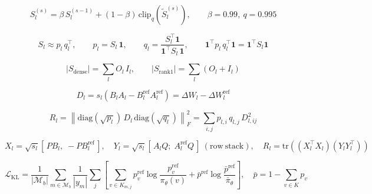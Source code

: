 \begin{equation}
  S_l^{(s)} = \beta\,S_l^{(s-1)} + (1-\beta)\,\mathrm{clip}_{q}\left(\tilde{S}_l^{(s)}\right),\qquad \beta = 0.99,\ q = 0.995
  \label{eq:eq_ema}
\end{equation}

\begin{equation}
  S_l \approx p_l\,q_l^{\top},\qquad p_l = S_l\,\mathbf{1},\qquad q_l = \frac{S_l^{\top}\mathbf{1}}{\mathbf{1}^{\top} S_l\,\mathbf{1}},\qquad \mathbf{1}^{\top}p_l\,q_l^{\top}\mathbf{1} = \mathbf{1}^{\top}S_l\mathbf{1}
  \label{eq:eq_rank1}
\end{equation}

\begin{equation}
  |S_{\mathrm{dense}}| = \sum_{l} O_l\,I_l,\qquad |S_{\mathrm{rank1}}| = \sum_{l}\left(O_l + I_l\right)
  \label{eq:eq_storage}
\end{equation}

\begin{equation}
  D_l = s_l\left(B_l A_l - B_l^{\mathrm{ref}} A_l^{\mathrm{ref}}\right) = \Delta W_l - \Delta W_l^{\mathrm{ref}}
  \label{eq:eq_D}
\end{equation}

\begin{equation}
  R_l = \left\| \mathrm{diag}\left(\sqrt{p_l}\right)\,D_l\,\mathrm{diag}\left(\sqrt{q_l}\right) \right\|_F^2 = \sum_{i,j} p_{l,i}\,q_{l,j}\,D_{l,ij}^2
  \label{eq:eq_R}
\end{equation}

\begin{equation}
  X_l = \sqrt{s_l}\left[\,P B_l,\; -P B_l^{\mathrm{ref}}\,\right],\quad Y_l = \sqrt{s_l}\left[\,A_l Q;\; A_l^{\mathrm{ref}} Q\,\right]\ (\mathrm{row\ stack}),\quad R_l = \mathrm{tr}\left(\left(X_l^{\top}X_l\right)\left(Y_l Y_l^{\top}\right)\right)
  \label{eq:eq_gram}
\end{equation}

\begin{equation}
  \mathcal{L}_{\mathrm{KL}} = \frac{1}{|\mathcal{M}_b|}\sum_{m\in\mathcal{M}_b}\frac{1}{|y_m|}\sum_{j}\left[\sum_{v\in K_{m,j}} p^{\mathrm{ref}}_{v}\log\frac{p^{\mathrm{ref}}_{v}}{\pi_\theta(v)} + \bar{p}^{\mathrm{ref}}\log\frac{\bar{p}^{\mathrm{ref}}}{\bar{\pi}_\theta}\right],\quad \bar{p} = 1 - \sum_{v\in K} p_v
  \label{eq:eq_kl}
\end{equation}

